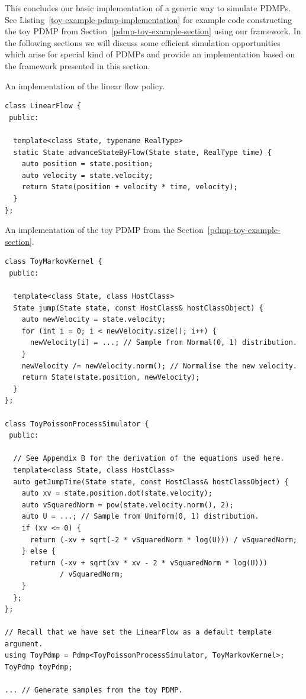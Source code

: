 \documentclass[report.tex]{subfiles}
\begin{document}
This concludes our basic implementation of a generic way to simulate PDMPs.
See Listing~\ref{toy-example-pdmp-implementation} for example code constructing
the toy PDMP from Section~\ref{pdmp-toy-example-section} using our framework.
In the following sections we will discuss some efficient simulation opportunities
which arise for special kind of PDMPs and provide an implementation based on the
framework presented in this section.

\begin{lstfloat}
\caption{An implementation of the linear flow policy.}
\label{linear-flow-implementation}
\begin{lstlisting}
class LinearFlow {
 public:

  template<class State, typename RealType>
  static State advanceStateByFlow(State state, RealType time) {
    auto position = state.position;
    auto velocity = state.velocity;
    return State(position + velocity * time, velocity);
  }
};
\end{lstlisting}
\end{lstfloat}

\begin{lstfloat}
\caption{An implementation of the toy PDMP from the Section~\ref{pdmp-toy-example-section}.}
\label{toy-example-pdmp-implementation}
\begin{lstlisting}
class ToyMarkovKernel {
 public:

  template<class State, class HostClass>
  State jump(State state, const HostClass& hostClassObject) {
    auto newVelocity = state.velocity;
    for (int i = 0; i < newVelocity.size(); i++) {
      newVelocity[i] = ...; // Sample from Normal(0, 1) distribution.
    }
    newVelocity /= newVelocity.norm(); // Normalise the new velocity.
    return State(state.position, newVelocity);
  }
};

class ToyPoissonProcessSimulator {
 public:

  // See Appendix B for the derivation of the equations used here.
  template<class State, class HostClass>
  auto getJumpTime(State state, const HostClass& hostClassObject) {
    auto xv = state.position.dot(state.velocity);
    auto vSquaredNorm = pow(state.velocity.norm(), 2);
    auto U = ...; // Sample from Uniform(0, 1) distribution.
    if (xv <= 0) {
      return (-xv + sqrt(-2 * vSquaredNorm * log(U))) / vSquaredNorm;
    } else {
      return (-xv + sqrt(xv * xv - 2 * vSquaredNorm * log(U)))
             / vSquaredNorm;
    }
  };
};

// Recall that we have set the LinearFlow as a default template argument.
using ToyPdmp = Pdmp<ToyPoissonProcessSimulator, ToyMarkovKernel>;
ToyPdmp toyPdmp;

... // Generate samples from the toy PDMP.
\end{lstlisting}
\end{lstfloat}
\end{document}
